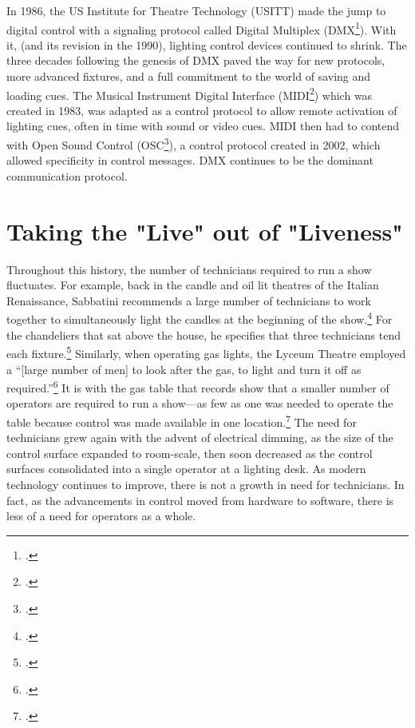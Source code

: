 \documentclass[
    12pt,
    twoside,
    bibstyle=chicago,
    headerstyle=uppercase,
	bibfile=biblatex_updating.bib
]{reedthesis}
\begin{document}
In 1986, the US Institute for Theatre Technology (USITT) made the jump to digital control with a signaling protocol called Digital Multiplex (DMX\footcite{EntertainmentTechnologyUSITT2024}). With it, (and its revision in the 1990), lighting control devices continued to shrink. The three decades following the genesis of DMX paved the way for new protocols, more advanced fixtures, and a full commitment to the world of saving and loading cues. The Musical Instrument Digital Interface (MIDI\footcite{MIDIShowControl}) which was created in 1983, was adapted as a control protocol to allow remote activation of lighting cues, often in time with sound or video cues. MIDI then had to contend with Open Sound Control (OSC\footcite{OSCSpecification102021}), a control protocol created in 2002, which allowed specificity in control messages. DMX continues to be the dominant communication protocol.

\section{Taking the "Live" out of "Liveness"}
Throughout this history, the number of technicians required to run a show fluctuates. For example, back in the candle and oil lit theatres of the Italian Renaissance, Sabbatini recommends a large number of technicians to work together to simultaneously light the candles at the beginning of the show.\footcite[p. 97]{hewittRenaissanceStageDocuments1958} For the chandeliers that sat above the house, he specifies that three technicians tend each fixture.\footcite[p. 98]{hewittRenaissanceStageDocuments1958} Similarly, when operating gas lights, the Lyceum Theatre employed a “[large number of men] to look after the gas, to light and turn it off as required.”\footcite[p. 904]{stokerIrvingStageLighting1911} It is with the gas table that records show that a smaller number of operators are required to run a show---as few as one was needed to operate the table because control was made available in one location.\footcite[p. 55]{penzelTheatreLightingElectricity1978} The need for technicians grew again with the advent of electrical dimming, as the size of the control surface expanded to room-scale, then soon decreased as the control surfaces consolidated into a single operator at a lighting desk. As modern technology continues to improve, there is not a growth in need for technicians. In fact, as the advancements in control moved from hardware to software, there is less of a need for operators as a whole.
\end{document}
